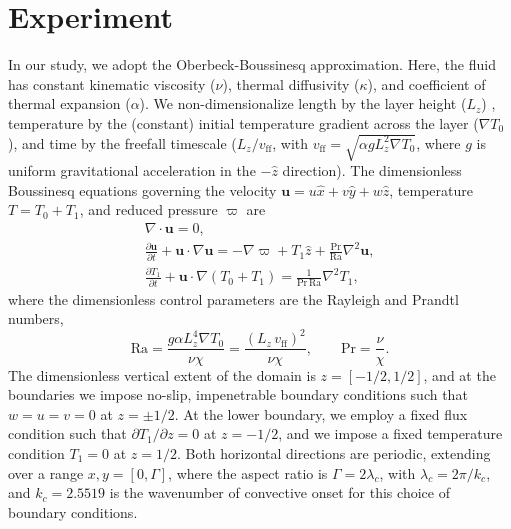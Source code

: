 \documentclass[aps, pre, onecolumn, nofootinbib, notitlepage, groupedaddress, amsfonts, amssymb, amsmath, longbibliography]{revtex4-1}
\newcommand{\DivU}{\ensuremath{\nabla\cdot\bm{u}}}
\newcommand{\grad}{\ensuremath{\nabla}}
\begin{document}
\section{Experiment}
\label{sec:experiment}
In our study, we adopt the Oberbeck-Boussinesq approximation.  Here, the
fluid has constant kinematic viscosity ($\nu$), thermal diffusivity ($\kappa$), and coefficient
of thermal expansion ($\alpha$).  We non-dimensionalize length by the layer height ($L_z$) ,
temperature by the (constant) initial temperature gradient across the layer ($\grad T_0$), and time
by the freefall timescale ($L_z / v_{\text{ff}}$, with $v_{\text{ff}} = \sqrt{\alpha g L_z^2 \grad T_0}$, where $g$ is 
uniform gravitational acceleration in the $-\hat{z}$ direction). The dimensionless Boussinesq
equations governing the velocity $\bm{u} = u\hat{x} + v\hat{y} + w\hat{z}$, temperature
$T = T_0 + T_1$, and reduced pressure $\varpi$ are \cite{spiegel&veronis1960}
\begin{gather}
\DivU = 0, 
	\label{eqn:incompressible}
\\
\frac{\partial \bm{u}}{\partial t} + \bm{u}\cdot\grad\bm{u} =
-\grad\varpi + T_1\hat{z} + \frac{\text{Pr}}{\text{Ra}}\grad^2\bm{u}, 
	\label{eqn:bouss_momentum}
\\
\frac{\partial T_1}{\partial t} + \bm{u}\cdot\grad(T_0 + T_1) = \frac{1}{\text{Pr}\,\text{Ra}}\grad^2 T_1,
	\label{eqn:bouss_energy}
\end{gather}
where the dimensionless control parameters are the Rayleigh and Prandtl numbers,
\begin{equation}
\text{Ra} = \frac{g \alpha L_z^4 \grad T_0}{\nu\chi} = \frac{(L_z\,v_{\text{ff}})^2}{\nu\chi}, \qquad \text{Pr} = \frac{\nu}{\chi}.
\end{equation}
The dimensionless vertical extent of the domain is $z = [-1/2, 1/2]$, and at the boundaries
we impose no-slip, impenetrable boundary conditions such that $w = u = v = 0$ at $z = \pm 1/2$.
At the lower boundary, we employ a fixed flux condition such that $\partial T_1 / \partial z = 0$
at $z = -1/2$, and we impose a fixed temperature condition $T_1 = 0$ at $z = 1/2$. Both
horizontal directions are periodic, extending over a range $x, y = [0, \Gamma]$, where
the aspect ratio is $\Gamma = 2 \lambda_c$, with
$\lambda_c = 2\pi/k_c$, and $k_c=2.5519$ is the wavenumber of convective onset for this choice of
boundary conditions.  
\end{document}

